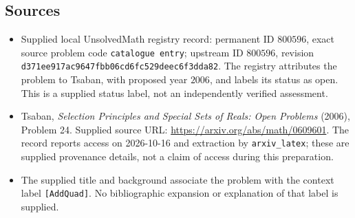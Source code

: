 \documentclass[11pt]{article}
\begin{document}
\subsection{Sources}
\begin{itemize}
\item Supplied local UnsolvedMath registry record: permanent ID \(800596\), exact source problem code \texttt{catalogue entry}; upstream ID \(800596\), revision \texttt{d371ee917ac9647fbb06cd6fc529deec6f3dda82}. The registry attributes the problem to Tsaban, with proposed year \(2006\), and labels its status as open. This is a supplied status label, not an independently verified assessment.
\item Tsaban, \emph{Selection Principles and Special Sets of Reals: Open Problems} (2006), Problem 24. Supplied source URL: \url{https://arxiv.org/abs/math/0609601}. The record reports access on 2026-10-16 and extraction by \texttt{arxiv\_latex}; these are supplied provenance details, not a claim of access during this preparation.
\item The supplied title and background associate the problem with the context label \texttt{[AddQuad]}. No bibliographic expansion or explanation of that label is supplied.
\end{itemize}
\end{document}
